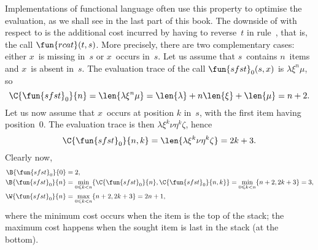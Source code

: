 Implementations of functional language often use this property to
optimise the evaluation, as we shall see in the last part of this
book. The downside of  with respect to 
is the additional cost incurred by having to reverse~\(t\) in
rule~\clause{\nu}, that is, the call \(\fun{rcat}(t,s)\). More
precisely, there are two complementary cases: either \(x\)~is missing
in~\(s\) or \(x\)~occurs in~\(s\). Let us assume that \(s\)~contains
\(n\)~items and \(x\)~is absent in~\(s\). The evaluation trace
 of the call
\(\fun{sfst}_0(s,x)\) is \(\lambda\xi^n\mu\), so
\begin{equation*}
  \C{\fun{sfst}_0}{n}
= \len{\lambda\xi^n\mu} = \len{\lambda} + n \len{\xi} + \len{\mu} = n
+ 2.
\end{equation*}
Let us now assume that \(x\)~occurs at position \(k\) in~\(s\),
with the first item having position~\(0\). The evaluation trace is
then \(\lambda \xi^{k}\nu\eta^k\zeta\), hence
\begin{equation*}
  \C{\fun{sfst}_0}{n,k} = \len{\lambda \xi^{k}\nu\eta^k\zeta} = 2k + 3.
\end{equation*}
Clearly now,
\begin{align*}
\B{\fun{sfst}_0}{0} & = 2,\\
\B{\fun{sfst}_0}{n} & = \min_{0 \leqslant k < n}\{\C{\fun{sfst}_0}{n}, \C{\fun{sfst}_0}{n,k}\}
                    = \min_{0 \leqslant k < n}\{n+2,2k+3\} = 3,\\
\W{\fun{sfst}_0}{n} & = \max_{0 \leqslant k < n}\{n+2,2k+3\} = 2n+1,
\end{align*}
where the minimum cost occurs when the item is the top of the stack;
the maximum cost happens when the sought item is last in the stack (at
the bottom).

